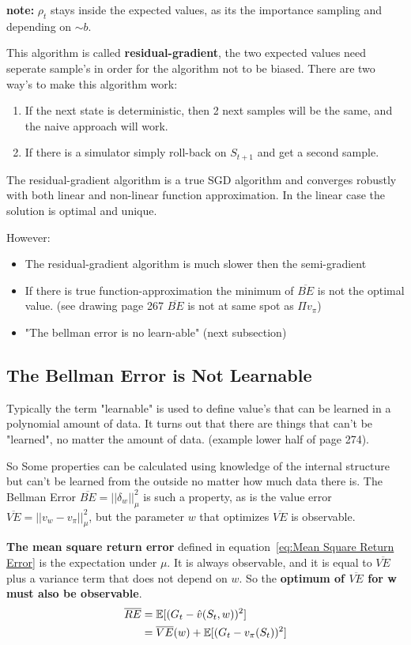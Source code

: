 \textbf{note:} $\rho_t$ stays inside the expected values, as its the importance sampling and depending on $\sim b$.

This algorithm is called \textbf{residual-gradient}, the two expected values need seperate sample's in order for the algorithm not to be biased. There are two way's to make this algorithm work:
\begin{enumerate}
	\item If the next state is deterministic, then 2 next samples will be the same, and the naive approach will work.
	\item If there is a simulator simply roll-back on $S_{t+1}$ and get a second sample.
\end{enumerate}
The residual-gradient algorithm is a true SGD algorithm and converges robustly with both linear and non-linear function approximation. In the linear case the solution is optimal and unique. 

However:
\begin{itemize}
	\item The residual-gradient algorithm is much slower then the semi-gradient
	\item If there is true function-approximation the minimum of $\overline{BE}$ is not the optimal value. (see drawing page 267 $\overline{BE}$ is not at same spot as $\Pi v_\pi$)
	\item "The bellman error is no learn-able" (next subsection)
\end{itemize}

\subsection{The Bellman Error is Not Learnable}
Typically the term "learnable" is used to define value's that can be learned in a polynomial amount of data.  It turns out that there are things that can't be "learned", no matter the amount of data. (example lower half of page 274).

So Some properties can be calculated using knowledge of the internal structure but can't be learned from the outside no matter how much data there is. The Bellman Error $\overline{BE}=||\delta_w||^2_\mu$ is such a property, as is the value error $\overline{VE}=||v_w - v_\pi||^2_\mu$, but the parameter $w$ that optimizes $\overline{VE}$ is observable.

\textbf{The mean square return error} defined in equation~\ref{eq:Mean Square Return Error} is the expectation under $\mu$. It is always observable, and it is equal to $\overline{VE}$ plus a variance term that does not depend on $w$. So the \textbf{optimum of $\overline{VE}$ for w must also be observable}.
\begin{equation}
\begin{split}
\overline{RE} & = \operatorname{\mathbb{E}}[(G_t - \hat{v}(S_t, w))^2] \\
& = \overline{VE}(w) + \operatorname{\mathbb{E}}[(G_t-v_{\pi}(S_t))^2] \\
\end{split}
\label{eq:Mean Square Return Error}
\end{equation}

